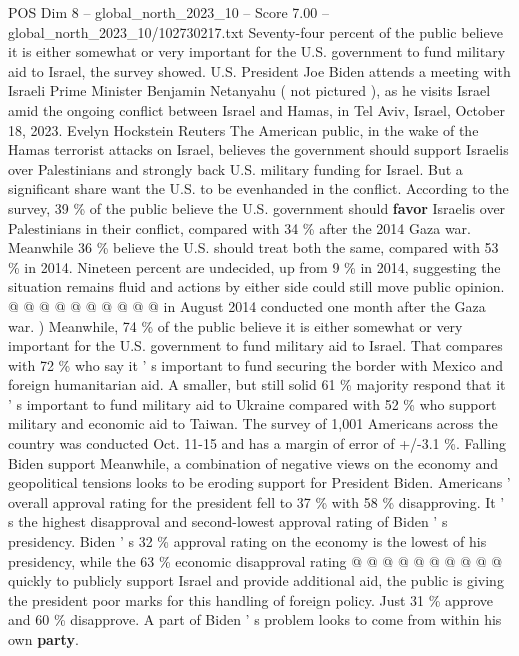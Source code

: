 \begin{textsample}{POS Dim 8 – global\_north\_2023\_10 – Score 7.00 – global\_north\_2023\_10/102730217.txt}  \label{ex:f8_pos_247}
Seventy-four percent of the public believe it is either somewhat or very important for the U.S. government to fund military aid to Israel, the survey showed.
U.S.
President Joe Biden attends a meeting with Israeli Prime Minister Benjamin Netanyahu ( not pictured ), as he visits Israel amid the ongoing conflict between Israel and Hamas, in Tel Aviv, Israel, October 18, 2023.
Evelyn Hockstein Reuters The American public, in the wake of the Hamas terrorist attacks on Israel, believes the government should support Israelis over Palestinians and strongly back U.S. military funding for Israel.
But a significant share want the U.S. to be evenhanded in the conflict.
According to the survey, 39 \% of the public believe the U.S. government should \textbf{favor} Israelis over Palestinians in their conflict, compared with 34 \% after the 2014 Gaza war.
Meanwhile 36 \% believe the U.S. should treat both the same, compared with 53 \% in 2014.
Nineteen percent are undecided, up from 9 \% in 2014, suggesting the situation remains fluid and actions by either side could still move public opinion. @ @ @ @ @ @ @ @ @ @ in August 2014 conducted one month after the Gaza war. ) Meanwhile, 74 \% of the public believe it is either somewhat or very important for the U.S. government to fund military aid to Israel.
That compares with 72 \% who say it ' s important to fund securing the border with Mexico and foreign humanitarian aid.
A smaller, but still solid 61 \% majority respond that it ' s important to fund military aid to Ukraine compared with 52 \% who support military and economic aid to Taiwan.
The survey of 1,001 Americans across the country was conducted Oct. 11-15 and has a margin of error of +/-3.1 \%.
Falling Biden support Meanwhile, a combination of negative views on the economy and geopolitical tensions looks to be eroding support for President Biden.
Americans ' overall approval rating for the president fell to 37 \% with 58 \% disapproving.
It ' s the highest disapproval and second-lowest approval rating of Biden ' s presidency.
Biden ' s 32 \% approval rating on the economy is the lowest of his presidency, while the 63 \% economic disapproval rating @ @ @ @ @ @ @ @ @ @ quickly to publicly support Israel and provide additional aid, the public is giving the president poor marks for this handling of foreign policy.
Just 31 \% approve and 60 \% disapprove.
A part of Biden ' s problem looks to come from within his own \textbf{party}.

\end{textsample}
